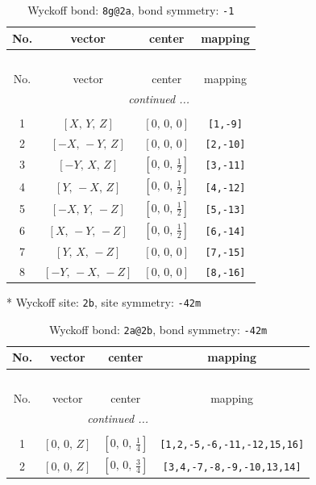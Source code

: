 \documentclass[fleqn,8pt]{jsarticle}
\begin{document}
\renewcommand{\arraystretch}{1.2}
\begin{longtable}{cccc}
\caption{Wyckoff bond: {\tt 8g@2a}, bond symmetry: {\tt -1}}
 \\
 \hline \hline
No. & vector & center & mapping \\ \hline \endfirsthead

\multicolumn{3}{l}{\tablename\ \thetable{}} \\
 \hline \hline
No. & vector & center & mapping \\ \hline \endhead

 \hline \hline
\multicolumn{3}{r}{\footnotesize\it continued ...} \\ \endfoot

 \hline \hline
\multicolumn{3}{r}{} \\ \endlastfoot

1 & $\left[ X,\, Y,\, Z \right]$ & $\left[ 0,\, 0,\, 0 \right]$ & {\tt [1,-9]} \\ \hline
2 & $\left[ - X,\, - Y,\, Z \right]$ & $\left[ 0,\, 0,\, 0 \right]$ & {\tt [2,-10]} \\ \hline
3 & $\left[ - Y,\, X,\, Z \right]$ & $\left[ 0,\, 0,\, \frac{1}{2} \right]$ & {\tt [3,-11]} \\ \hline
4 & $\left[ Y,\, - X,\, Z \right]$ & $\left[ 0,\, 0,\, \frac{1}{2} \right]$ & {\tt [4,-12]} \\ \hline
5 & $\left[ - X,\, Y,\, - Z \right]$ & $\left[ 0,\, 0,\, \frac{1}{2} \right]$ & {\tt [5,-13]} \\ \hline
6 & $\left[ X,\, - Y,\, - Z \right]$ & $\left[ 0,\, 0,\, \frac{1}{2} \right]$ & {\tt [6,-14]} \\ \hline
7 & $\left[ Y,\, X,\, - Z \right]$ & $\left[ 0,\, 0,\, 0 \right]$ & {\tt [7,-15]} \\ \hline
8 & $\left[ - Y,\, - X,\, - Z \right]$ & $\left[ 0,\, 0,\, 0 \right]$ & {\tt [8,-16]} \\
\end{longtable}
* Wyckoff site: {\tt 2b}, site symmetry: {\tt -42m}
\renewcommand{\arraystretch}{1.2}
\begin{longtable}{cccc}
\caption{Wyckoff bond: {\tt 2a@2b}, bond symmetry: {\tt -42m}}
 \\
 \hline \hline
No. & vector & center & mapping \\ \hline \endfirsthead

\multicolumn{3}{l}{\tablename\ \thetable{}} \\
 \hline \hline
No. & vector & center & mapping \\ \hline \endhead

 \hline \hline
\multicolumn{3}{r}{\footnotesize\it continued ...} \\ \endfoot

 \hline \hline
\multicolumn{3}{r}{} \\ \endlastfoot

1 & $\left[ 0,\, 0,\, Z \right]$ & $\left[ 0,\, 0,\, \frac{1}{4} \right]$ & {\tt [1,2,-5,-6,-11,-12,15,16]} \\ \hline
2 & $\left[ 0,\, 0,\, Z \right]$ & $\left[ 0,\, 0,\, \frac{3}{4} \right]$ & {\tt [3,4,-7,-8,-9,-10,13,14]} \\
\end{longtable}
\end{document}
